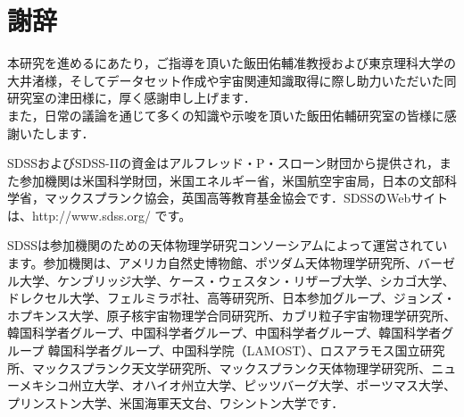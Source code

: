 \documentclass[a4j, 11pt]{jarticle}
\begin{document}



\newpage
\nocite{*}                 %


\newpage
\section*{謝辞}
本研究を進めるにあたり，ご指導を頂いた飯田佑輔准教授および東京理科大学の大井渚様，そしてデータセット作成や宇宙関連知識取得に際し助力いただいた同研究室の津田様に，厚く感謝申し上げます．\\
また，日常の議論を通じて多くの知識や示唆を頂いた飯田佑輔研究室の皆様に感謝いたします．

SDSSおよびSDSS-IIの資金はアルフレッド・P・スローン財団から提供され，また参加機関は米国科学財団，米国エネルギー省，米国航空宇宙局，日本の文部科学省，マックスプランク協会，英国高等教育基金協会です．SDSSのWebサイトは、http://www.sdss.org/ です。 

SDSSは参加機関のための天体物理学研究コンソーシアムによって運営されています。参加機関は、アメリカ自然史博物館、ポツダム天体物理学研究所、バーゼル大学、ケンブリッジ大学、ケース・ウェスタン・リザーブ大学、シカゴ大学、ドレクセル大学、フェルミラボ社、高等研究所、日本参加グループ、ジョンズ・ホプキンス大学、原子核宇宙物理学合同研究所、カブリ粒子宇宙物理学研究所、韓国科学者グループ、中国科学者グループ、中国科学者グループ、韓国科学者グループ 韓国科学者グループ、中国科学院（LAMOST）、ロスアラモス国立研究所、マックスプランク天文学研究所、マックスプランク天体物理学研究所、ニューメキシコ州立大学、オハイオ州立大学、ピッツバーグ大学、ポーツマス大学、プリンストン大学、米国海軍天文台、ワシントン大学です．
\end{document}
